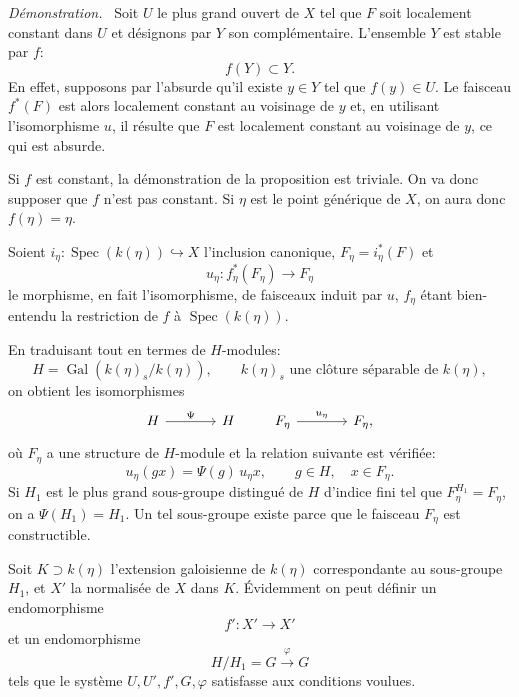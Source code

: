 \documentclass[11pt]{article}
\newenvironment{prooftext}[1][Proof]{\par\noindent\emph{#1.}\ }{\par\medskip}
\DeclareMathOperator{\Spec}{Spec}
\providecommand{\Gal}{\operatorname{Gal}}
\providecommand{\Spec}{\operatorname{Spec}}
\providecommand{\Spec}{\operatorname{Spec}}
\providecommand{\Spec}{\operatorname{Spec}}
\providecommand{\Spec}{\operatorname{Spec}}
\providecommand{\Gal}{\operatorname{Gal}}
\begin{document}
\begin{prooftext}[Démonstration]
Soit $U$ le plus grand ouvert de $X$ tel que $F$ soit localement constant dans $U$ et désignons par $Y$ son complémentaire. L'ensemble $Y$ est stable par $f$:
\[
f(Y)\subset Y.
\]
En effet, supposons par l'absurde qu'il existe $y\in Y$ tel que $f(y)\in U$. Le faisceau $f^*(F)$ est alors localement constant au voisinage de $y$ et, en utilisant l'isomorphisme $u$, il résulte que $F$ est localement constant au voisinage de $y$, ce qui est absurde.

Si $f$ est constant, la démonstration de la proposition est triviale. On va donc supposer que $f$ n'est pas constant. Si $\eta$ est le point générique de $X$, on aura donc $f(\eta)=\eta$.

Soient $i_\eta:\Spec(k(\eta))\hookrightarrow X$ l'inclusion canonique, $F_\eta=i_\eta^*(F)$ et
\[
u_\eta:f_\eta^*(F_\eta)\longrightarrow F_\eta
\]
le morphisme, en fait l'isomorphisme, de faisceaux induit par $u$, $f_\eta$ étant bien-entendu la restriction de $f$ à $\Spec(k(\eta))$.

En traduisant tout en termes de $H$-modules:
\[
H=\Gal(k(\eta)_s/k(\eta)),\qquad k(\eta)_s\text{ une clôture séparable de }k(\eta),
\]
on obtient les isomorphismes
\[
\begin{tikzcd}[column sep=large]
H \arrow[r,"\Psi"] & H
\end{tikzcd}
\qquad
\begin{tikzcd}[column sep=large]
F_\eta \arrow[r,"u_\eta"] & F_\eta,
\end{tikzcd}
\]
où $F_\eta$ a une structure de $H$-module et la relation suivante est vérifiée:
\[
u_\eta(gx)=\Psi(g)\,u_\eta x,
\qquad g\in H,
\quad x\in F_\eta.
\]
Si $H_1$ est le plus grand sous-groupe distingué de $H$ d'indice fini tel que $F_\eta^{H_1}=F_\eta$, on a $\Psi(H_1)=H_1$. Un tel sous-groupe existe parce que le faisceau $F_\eta$ est constructible.

Soit $K\supset k(\eta)$ l'extension galoisienne de $k(\eta)$ correspondante au sous-groupe $H_1$, et $X'$ la normalisée de $X$ dans $K$. Évidemment on peut définir un endomorphisme
\[
f':X'\longrightarrow X'
\]
et un endomorphisme
\[
H/H_1=G\xrightarrow{\varphi}G
\]
tels que le système $U,U',f',G,\varphi$ satisfasse aux conditions voulues.
\end{prooftext}
\end{document}
